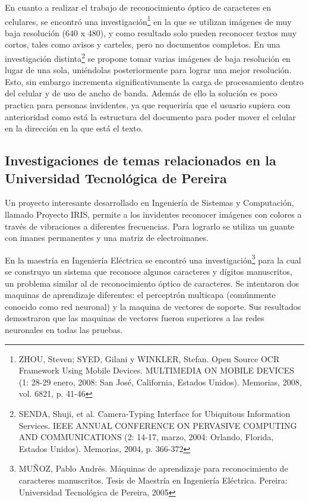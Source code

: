 \documentclass[a4paper, 11pt, oneside]{report}
\begin{document}
En cuanto a realizar el trabajo de reconocimiento óptico de caracteres en celulares, se encontró una investigación\footnote{ZHOU, Steven; SYED, Gilani y WINKLER, Stefan. Open Source OCR Framework Using Mobile Devices. MULTIMEDIA ON MOBILE DEVICES (1: 28-29 enero, 2008: San José, California, Estados Unidos). Memorias, 2008, vol. 6821, p. 41-46} en la que se utilizan imágenes de muy baja resolución (640 x 480), y como resultado solo pueden reconocer textos muy cortos, tales como avisos y carteles, pero no documentos completos. En una investigación distinta\footnote{SENDA, Shuji, et al. Camera-Typing Interface for Ubiquitous Information Services. IEEE ANNUAL CONFERENCE ON PERVASIVE COMPUTING AND COMMUNICATIONS (2: 14-17, marzo, 2004: Orlando, Florida, Estados Unidos). Memorias, 2004, p. 366-372} se propone tomar varias imágenes de baja resolución en lugar de una sola, uniéndolas posteriormente para lograr una mejor resolución. Esto, sin embargo incrementa significativamente la carga de procesamiento dentro del celular y de uso de ancho de banda. Además de ello la solución es poco practica para personas invidentes, ya que requeriría que el usuario supiera con anterioridad como está la estructura del documento para poder mover el celular en la dirección en la que está el texto.
	
\subsection{Investigaciones de temas relacionados en la Universidad Tecnológica de Pereira}

Un proyecto interesante desarrollado en Ingeniería de Sistemas y Computación, llamado Proyecto IRIS, permite a los invidentes reconocer imágenes con colores a través de vibraciones a diferentes frecuencias. Para lograrlo se utiliza un guante con imanes permanentes y una matriz de electroimanes.

En la maestría en Ingeniería Eléctrica se encontró una investigación\footnote{MUÑOZ, Pablo Andrés. Máquinas de aprendizaje para reconocimiento de caracteres manuscritos. Tesis de Maestría en Ingeniería Eléctrica. Pereira: Universidad Tecnológica de Pereira, 2005} para la cual se construyo un sistema que reconoce algunos caracteres y dígitos manuscritos, un problema similar al de reconocimiento óptico de caracteres. Se intentaron dos maquinas de aprendizaje diferentes: el perceptrón multicapa (comúnmente conocido como red neuronal) y la maquina de vectores de soporte. Sus resultados demostraron que las maquinas de vectores fueron superiores a las redes neuronales en todas las pruebas.
    
\end{document}
